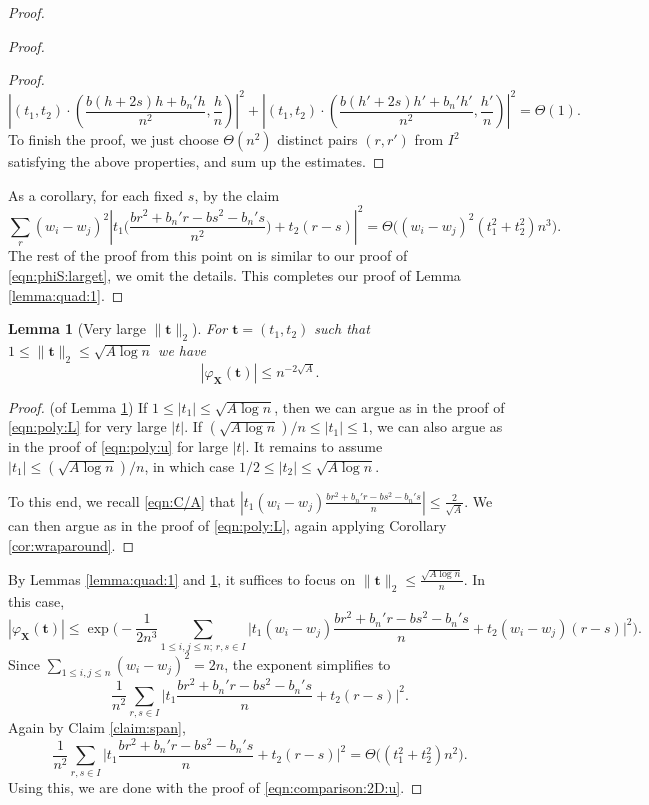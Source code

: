 \documentclass[reqno]{amsart}
\newcommand\BMt{{\bm t}}
\newcommand\BMX{{\bm X}}
\theoremstyle{plain}
\newtheorem{lemma}[theorem]{Lemma}
\theoremstyle{definition}
\begin{document}
\begin{proof}
\begin{proof}
\begin{proof}
\[
|(t_{1},t_{2}) \cdot (\frac{b(h+2s)h+b_{n}'h}{n^{2}},\frac{h}{n}) |^{2} +  |(t_{1},t_{2}) \cdot (\frac{b(h'+2s)h'+b_{n}'h'}{n^{2}}, \frac{h'}{n})|^{2} =\Theta(1).
\]
To finish the proof, we just choose
$\Theta(n^{2})$ distinct pairs $(r,r')$ from $I^{2}$ satisfying the above properties, and sum up the estimates.
\end{proof}
As a corollary, for each fixed $s$, by the claim
\[
\sum_{r} (w_{i}-w_{j})^{2} |t_{1}\big(\frac{b r^2 + b_{n}' r -b s^2 - b_{n}' s}{n^{2}}\big) + t_{2} (r - s)|^{2} =\Theta\Big((w_{i}-w_{j})^{2} (t_{1}^{2}+t_{2}^{2}) n^{3}\Big).
\]
The rest of the proof from this point on is similar to our proof of  \eqref{eqn:phiS:larget}, we omit the details. This completes our proof of Lemma \ref{lemma:quad:1}.
\end{proof}

\begin{lemma}[Very large $\|\BMt\|_{2}$]\label{lemma:quad:2}
For $\BMt=(t_{1},t_{2})$ such that $1 \le \|\BMt\|_{2} \le  \sqrt{A\log n}$ we have
\[
|\varphi_{\BMX}(\BMt)| \le n^{-2\sqrt{A}}.
\]
\end{lemma}

\begin{proof}(of Lemma \ref{lemma:quad:2})
If $1 \le |t_{1}| \le \sqrt{A\log n}$, then we can argue as in the proof of \eqref{eqn:poly:L} for very large $|t|$.  
If $(\sqrt{A\log n})/n \le |t_{1}| \le 1$, we can also argue as in the proof of \eqref{eqn:poly:u} for large $|t|$. It remains to assume $|t_{1}| \le (\sqrt{A\log n})/n$, in which case $1/2 \le |t_{2}| \le \sqrt{A\log n}$.  

To this end, we recall \eqref{eqn:C/A} that $|t_{1} (w_{i}-w_{j})\frac{b r^2 + b_{n}' r -b s^2 - b_{n}' s}{n}| \le \frac{2}{\sqrt{A}}$. We can then argue as in the proof of \eqref{eqn:poly:L}, again applying Corollary \ref{cor:wraparound}.
\end{proof}



By Lemmas \ref{lemma:quad:1} and \ref{lemma:quad:2}, it suffices to focus on $\|\BMt\|_{2} \le \frac{\sqrt{A\log n}}{n}$. In this case,
\[
|\varphi_{\BMX}(\BMt)| \le \exp\Big(-\frac{1}{2n^{3}} \sum_{1\le i,j\le n; \, r,s\in I} \big| t_{1} (w_{i}-w_{j}) \frac{b r^2 + b_{n}' r -b s^2 - b_{n}' s}{n} + t_{2}(w_{i}-w_{j}) (r - s) \big|^{2} \Big).
\]
Since $\sum_{1\le i,j\le n}(w_{i}-w_{j})^2=2n$, the exponent simplifies to
\[
\frac{1}{n^{2}} \sum_{r,s \in I} \big| t_{1} \frac{b r^2 + b_{n}' r -b s^2 - b_{n}' s}{n} + t_{2} (r - s)  \big|^{2}.
\] 
Again by Claim \ref{claim:span}, 
\[
\frac{1}{n^{2}} \sum_{r,s \in I} \big| t_{1} \frac{b r^2 + b_{n}' r -b s^2 - b_{n}' s}{n} + t_{2} (r - s)  \big|^{2} =\Theta \Big((t_{1}^{2}+t_{2}^{2})n^{2}\Big).
\]
Using this, we are done with the proof of \eqref{eqn:comparison:2D:u}.
\end{proof}
\end{document}
